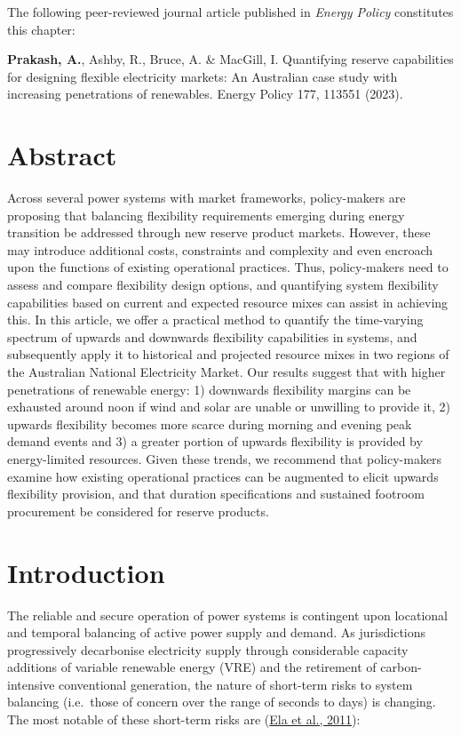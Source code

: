 \documentclass[12pt,a4paper,]{report}
\begin{document}
The following peer-reviewed journal article published in \emph{Energy
Policy} constitutes this chapter:

\textbf{Prakash, A.}, Ashby, R., Bruce, A. \& MacGill, I. Quantifying
reserve capabilities for designing flexible electricity markets: An
Australian case study with increasing penetrations of renewables. Energy
Policy 177, 113551 (2023).

\hypertarget{abstract-2}{%
\section{Abstract}\label{abstract-2}}

Across several power systems with market frameworks, policy-makers are
proposing that balancing flexibility requirements emerging during energy
transition be addressed through new reserve product markets. However,
these may introduce additional costs, constraints and complexity and
even encroach upon the functions of existing operational practices.
Thus, policy-makers need to assess and compare flexibility design
options, and quantifying system flexibility capabilities based on
current and expected resource mixes can assist in achieving this. In
this article, we offer a practical method to quantify the time-varying
spectrum of upwards and downwards flexibility capabilities in systems,
and subsequently apply it to historical and projected resource mixes in
two regions of the Australian National Electricity Market. Our results
suggest that with higher penetrations of renewable energy: 1) downwards
flexibility margins can be exhausted around noon if wind and solar are
unable or unwilling to provide it, 2) upwards flexibility becomes more
scarce during morning and evening peak demand events and 3) a greater
portion of upwards flexibility is provided by energy-limited resources.
Given these trends, we recommend that policy-makers examine how existing
operational practices can be augmented to elicit upwards flexibility
provision, and that duration specifications and sustained footroom
procurement be considered for reserve products.

\hypertarget{sec:reserves-intro}{%
\section{Introduction}\label{sec:reserves-intro}}

The reliable and secure operation of power systems is contingent upon
locational and temporal balancing of active power supply and demand. As
jurisdictions progressively decarbonise electricity supply through
considerable capacity additions of variable renewable energy (VRE) and
the retirement of carbon-intensive conventional generation, the nature
of short-term risks to system balancing (i.e.~those of concern over the
range of seconds to days) is changing. The most notable of these
short-term risks are
(\protect\hyperlink{ref-elaOperatingReservesVariable2011}{Ela et al.,
2011}):
\end{document}
